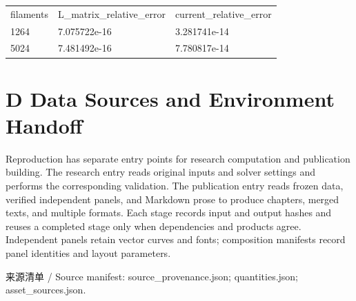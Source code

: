 \documentclass[11pt]{article}
\begin{document}
\begin{table}[!htbp]
\par
\begingroup\footnotesize\begin{tabular}{p{55.26666666666667mm}|p{55.26666666666667mm}|p{55.26666666666667mm}}
\toprule
filaments & L\_\allowbreak matrix\_\allowbreak relative\_\allowbreak error & current\_\allowbreak relative\_\allowbreak error\\
1264 & 7.075722e-16 & 3.281741e-14\\
5024 & 7.481492e-16 & 7.780817e-14\\
\bottomrule\end{tabular}\endgroup
\end{table}
\FloatBarrier
\section*{D Data Sources and Environment Handoff}
\hypertarget{chapter-D}{}
Reproduction has separate entry points for research computation and publication building. The research entry reads original inputs and solver settings and performs the corresponding validation. The publication entry reads frozen data, verified independent panels, and Markdown prose to produce chapters, merged texts, and multiple formats. Each stage records input and output hashes and reuses a completed stage only when dependencies and products agree. Independent panels retain vector curves and fonts; composition manifests record panel identities and layout parameters.


来源清单 / Source manifest: source\_provenance.json; quantities.json; asset\_sources.json.
\end{document}

